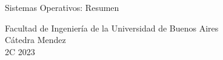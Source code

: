 \documentclass{article}
\begin{document}
\begin{titlepage}
  \vspace*{1cm}

  \begin{center}
    {\Huge{Sistemas Operativos: Resumen}}
  \end{center}

  \vspace{0.4cm}

  \begin{center}
    {\LARGE{Facultad de Ingeniería de la Universidad de Buenos Aires}}\\
    \vspace{0.3cm}
    {\Large{Cátedra Mendez}}\\
    \vspace{0.3cm}
    {\large{2C 2023}}\\
  \end{center}


\end{titlepage}
\end{document}
